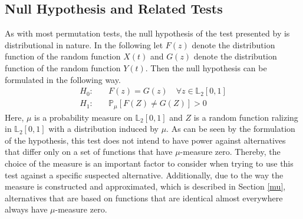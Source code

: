 \documentclass[12pt, a4paper]{article}
\theoremstyle{MAstyle} \newtheorem{assumption}{Assumption}[section]
\theoremstyle{MAstyle} \newtheorem{definition}{Definition}[section]
\theoremstyle{MAstyle} \newtheorem{theorem}{Theorem}[section]
\begin{document}
		\subsection{Null Hypothesis and Related Tests}
			As with most permutation tests, the null hypothesis of the test presented by \cite{bugni_permutation_2021} is distributional in nature. In the following let $F(z)$ denote the distribution function of the random function $X(t)$ and $G(z)$ denote the distribution function of the random function $Y(t)$. Then the null hypothesis can be formulated in the following way.
			\begin{equation}
				\begin{split}
					H_0: \quad &F(z) = G(z) \quad \forall z \in \mathbb{L}_2[0,1] \\
					H_1: \quad &\mathbb{P}_{\mu}\left[F(Z) \neq G(Z)\right] > 0
				\end{split}
			\end{equation}
			Here, $\mu$ is a probability measure on $\mathbb{L}_2[0,1]$ and $Z$ is a random function ralizing in $\mathbb{L}_2[0,1]$ with a distribution induced by $\mu$. As can be seen by the formulation of the hypothesis, this test does not intend to have power against alternatives that differ only on a set of functions that have $\mu$-measure zero. Thereby, the choice of the measure is an important factor to consider when trying to use this test against a specific suspected alternative. Additionally, due to the way the measure is constructed and approximated, which is described in Section \ref{mu}, alternatives that are based on functions that are identical almost everywhere always have $\mu$-measure zero. \\
			
\end{document}
